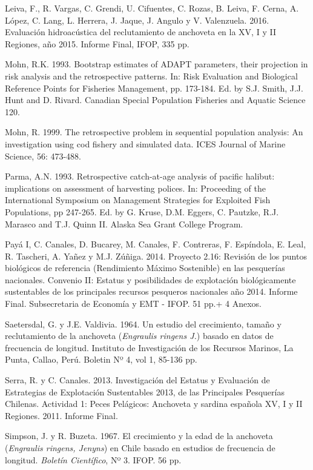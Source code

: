 \documentclass[letter,11pt]{article}
\begin{document}
Leiva, F., R. Vargas, C. Grendi, U. Cifuentes, C. Rozas, B. Leiva, F.
Cerna, A. L\'opez, C. Lang, L. Herrera, J. Jaque, J. Angulo y V.
Valenzuela. 2016. Evaluaci\'on hidroac\'ustica del reclutamiento de
anchoveta en la XV, I y II Regiones, a\~{n}o 2015. Informe Final, IFOP, 335
pp.


Mohn, R.K. 1993. Bootstrap estimates of ADAPT parameters, their projection
in risk analysis and the retrospective patterns. In: Risk Evaluation and
Biological Reference Points for Fisheries Management, pp. 173-184. Ed. by
S.J. Smith, J.J. Hunt and D. Rivard. Canadian Special Population Fisheries
and Aquatic Science 120.

Mohn, R. 1999. The retrospective problem in sequential population analysis:
An investigation using cod fishery and simulated data. ICES Journal of Marine
Science, 56: 473-488.


Parma, A.N. 1993. Retrospective catch-at-age analysis of pacific halibut:
implications on assessment of harvesting polices. In: Proceeding of the
International Symposium on Management Strategies for Exploited Fish
Populations, pp 247-265. Ed. by G. Kruse, D.M. Eggers, C. Pautzke,
R.J. Marasco and T.J. Quinn II. Alaska Sea Grant College Program.

Pay\'a I, C. Canales, D. Bucarey, M. Canales, F. Contreras, F. Esp\'indola,
E. Leal, R. Tascheri, A. Ya\~{n}ez y M.J. Z\'u\~{n}iga. 2014. Proyecto 2.16:
Revisi\'on de los puntos biol\'ogicos de referencia (Rendimiento M\'aximo
Sostenible) en las pesquer\'ias nacionales. Convenio II: Estatus y
posibilidades de explotaci\'on biol\'ogicamente sustentables de los
principales recursos pesqueros nacionales a\~{n}o 2014. Informe Final.
Subsecretaria de Econom\'ia y EMT - IFOP. 51 pp.+ 4 Anexos.


Saetersdal, G. y J.E. Valdivia. 1964. Un estudio del crecimiento, tama\~{n}o
y reclutamiento de la anchoveta (\textit{Engraulis ringens J.}) basado en datos
de frecuencia de longitud. Instituto de Investigaci\'on de los Recursos
Marinos, La Punta, Callao, Per\'u. Boletin Nº 4, vol 1, 85-136 pp.


Serra, R. y C. Canales. 2013. Investigaci\'on del Estatus y Evaluaci\'on de
Estrategias de Explotaci\'on Sustentables 2013, de las Principales
Pesquer\'ias Chilenas. Actividad 1: Peces Pel\'agicos: Anchoveta y sardina
espa\~{n}ola XV, I y II Regiones. 2011. Informe Final.


Simpson, J. y R. Buzeta. 1967. El crecimiento y la edad de la anchoveta
(\textit{Engraulis ringens, Jenyns}) en Chile basado en estudios de
frecuencia de longitud. \textit{Bolet\'in Cient\'ifico}, Nº 3. IFOP. 56 pp.
\end{document}
